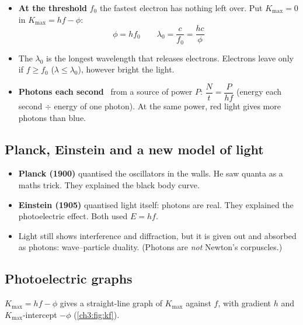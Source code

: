 \begin{itemize}
  \item \textbf{At the threshold} $f_0$ the fastest electron has nothing left over. Put
        $K_\mathrm{max} = 0$ in $K_\mathrm{max} = hf - \phi$:
        \[\phi = hf_0 \qquad \lambda_0 = \frac{c}{f_0} = \frac{hc}{\phi}\]
        {\centering\hscbadgenotonsheet\par}
  \item The  $\lambda_0$ is the longest wavelength that
        releases electrons. Electrons leave only if $f \ge f_0$ ($\lambda \le
        \lambda_0$), however bright the light.
  \item \textbf{Photons each second} \hscbadgenotonsheet\ from a source of power
        $P$: $\dfrac{N}{t} = \dfrac{P}{hf}$ (energy each second $\div$ energy of one
        photon). At the same power, red light gives more photons
        than blue.
\end{itemize}

\subsection{Planck, Einstein and a new model of light}

\begin{itemize}
  \item \textbf{Planck (1900)} quantised the oscillators in the walls. He saw quanta as a
        maths trick. They explained the black body curve.
  \item \textbf{Einstein (1905)} quantised light itself: photons are real. They explained
        the photoelectric effect. Both used $E = hf$.
  \item Light still shows interference and diffraction, but it is given out and absorbed
        as photons: wave--particle duality. (Photons are \emph{not} Newton's
        corpuscles.)
\end{itemize}

\subsection{Photoelectric graphs}

$K_\mathrm{max} = hf - \phi$ gives a straight-line graph of $K_\mathrm{max}$ against $f$,
with gradient $h$ and $K_\mathrm{max}$-intercept $-\phi$ (\cref{ch3:fig:kf}).

